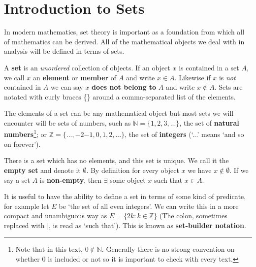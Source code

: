 \documentclass[../real_analysis.tex]{subfiles}
\begin{document}
    \section{Introduction to Sets}
        In modern mathematics, set theory is important as a foundation from which all of mathematics can be derived. All of the mathematical objects we deal with in analysis will be defined in terms of sets.
        \begin{definition}
            A \textbf{set} is an \textit{unordered} collection of objects. If an object $x$ is contained in a set $A$, we call $x$ an \textbf{element} or \textbf{member} of $A$ and write $x \in A$. Likewise if $x$ is \textit{not} contained in $A$ we can say $x$ \textbf{does not belong to} $A$ and write $x \notin A$. Sets are notated with curly braces \{\} around a comma-separated list of the elements.
        \end{definition}
        The elements of a set can be any mathematical object but most sets we will encounter will be sets of numbers, such as $\mathbb{N}=\{1, 2, 3, ...\}$, the set of \textbf{natural numbers}\footnote{Note that in this text, $0 \notin \mathbb{N}$. Generally there is no strong convention on whether 0 is included or not so it is important to check with every text.}; or $\mathbb{Z}=\{..., {-2} {-1}, 0, 1, 2, ...\}$, the set of \textbf{integers} (`...' means `and so on forever').

        \begin{definition}
            There is a set which has no elements, and this set is unique. We call it the \textbf{empty set} and denote it $\emptyset$. By definition for every object $x$ we have $x \notin \emptyset$. If we say a set $A$ is \textbf{non-empty}, then $\exists$ some object $x$ such that $x \in A$.
        \end{definition}

        It is useful to have the ability to define a set in terms of some kind of predicate, for example let $E$ be `the set of all even integers'. We can write this in a more compact and unambiguous way as $E = \{2k : k \in \mathbb{Z}\}$ (The colon, sometimes replaced with $|$, is read as `such that'). This is known as \textbf{set-builder notation}.
\end{document}
